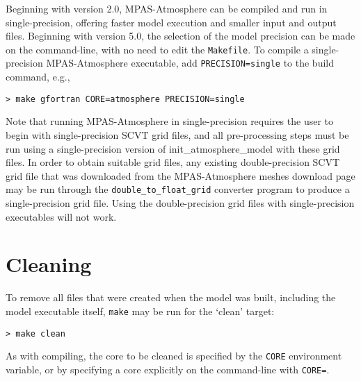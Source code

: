 Beginning with version 2.0, MPAS-Atmosphere can be compiled and run in single-precision, offering faster 
model execution and smaller input and output files. Beginning with version 5.0, the selection of the
model precision can be made on the command-line, with no need to edit the {\tt Makefile}.
To compile a single-precision MPAS-Atmosphere executable, add {\tt PRECISION=single} to the build command, e.g.,

\vspace{12pt}
{\tt > make gfortran CORE=atmosphere PRECISION=single}
\vspace{12pt}

Note that running MPAS-Atmosphere in single-precision requires the user to begin with single-precision SCVT grid files, 
and all pre-processing steps must be run using a single-precision version of init\_atmosphere\_model with these grid files. 
In order to obtain suitable grid files, any existing double-precision SCVT grid file that was downloaded from the MPAS-Atmosphere 
meshes download page may be run through the {\tt double\_to\_float\_grid} converter program to produce a single-precision grid file. 
Using the double-precision grid files with single-precision executables will not work.

\section{Cleaning}

To remove all files  that were created when the model was built,
including the model executable itself, {\tt make} may be run for the
`clean' target:

\vspace{12pt}
{\tt > make clean}
\vspace{12pt}

As with compiling, the core to be cleaned is specified by the {\tt CORE}
environment variable, or by specifying a core explicitly on the
command-line with {\tt CORE=}.
